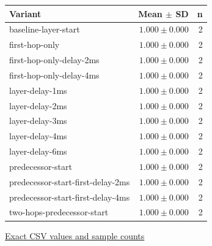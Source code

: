 \begin{center}{\scriptsize\setlength{\tabcolsep}{3pt}
\begin{tabular}{lrr}
\toprule
Variant & Mean $\pm$ SD & n \\
\midrule
baseline-layer-start & $1.000\pm0.000$ & 2 \\
first-hop-only & $1.000\pm0.000$ & 2 \\
first-hop-only-delay-2ms & $1.000\pm0.000$ & 2 \\
first-hop-only-delay-4ms & $1.000\pm0.000$ & 2 \\
layer-delay-1ms & $1.000\pm0.000$ & 2 \\
layer-delay-2ms & $1.000\pm0.000$ & 2 \\
layer-delay-3ms & $1.000\pm0.000$ & 2 \\
layer-delay-4ms & $1.000\pm0.000$ & 2 \\
layer-delay-6ms & $1.000\pm0.000$ & 2 \\
predecessor-start & $1.000\pm0.000$ & 2 \\
predecessor-start-first-delay-2ms & $1.000\pm0.000$ & 2 \\
predecessor-start-first-delay-4ms & $1.000\pm0.000$ & 2 \\
two-hops-predecessor-start & $1.000\pm0.000$ & 2 \\
\bottomrule\end{tabular}}
{\footnotesize\href{https://github.com/sanjeevkrishnaa/Compiler-Driven-ACE/blob/codex/ace-scheduler-correctness/docs/latex/qft96_final/data/variants_mesh_yx_completion_rate.csv}{Exact CSV values and sample counts}}
\end{center}

